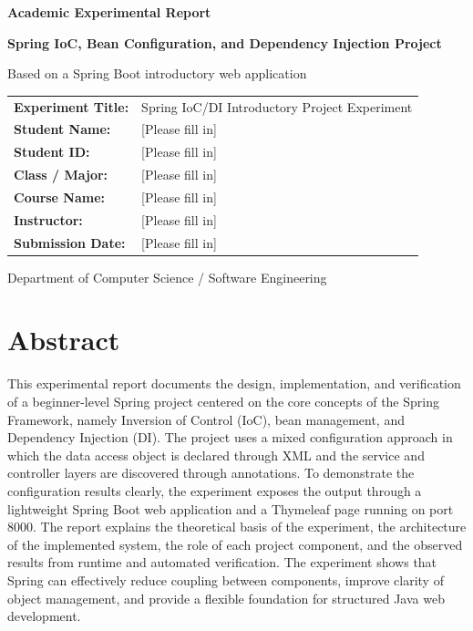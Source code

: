 \documentclass[12pt,a4paper]{article}
\begin{document}
\begin{titlepage}
    \centering
    \vspace*{2cm}

    {\Large\bfseries Academic Experimental Report\par}
    \vspace{0.8cm}
    {\LARGE\bfseries Spring IoC, Bean Configuration, and Dependency Injection Project\par}
    \vspace{1.2cm}
    {\large Based on a Spring Boot introductory web application\par}

    \vspace{2cm}

    \begin{tabular}{>{\bfseries}p{4.2cm} p{8.5cm}}
        Experiment Title: & Spring IoC/DI Introductory Project Experiment \\
        Student Name: & [Please fill in] \\
        Student ID: & [Please fill in] \\
        Class / Major: & [Please fill in] \\
        Course Name: & [Please fill in] \\
        Instructor: & [Please fill in] \\
        Submission Date: & [Please fill in] \\
    \end{tabular}

    \vfill
    {\large Department of Computer Science / Software Engineering\par}
\end{titlepage}


\section*{Abstract}
This experimental report documents the design, implementation, and verification of a beginner-level Spring project centered on the core concepts of the Spring Framework, namely Inversion of Control (IoC), bean management, and Dependency Injection (DI). The project uses a mixed configuration approach in which the data access object is declared through XML and the service and controller layers are discovered through annotations. To demonstrate the configuration results clearly, the experiment exposes the output through a lightweight Spring Boot web application and a Thymeleaf page running on port 8000. The report explains the theoretical basis of the experiment, the architecture of the implemented system, the role of each project component, and the observed results from runtime and automated verification. The experiment shows that Spring can effectively reduce coupling between components, improve clarity of object management, and provide a flexible foundation for structured Java web development.
\end{document}
